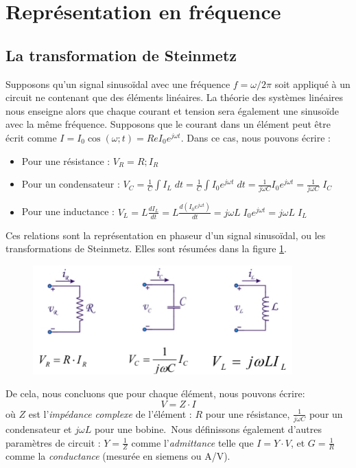 \section{Représentation en fréquence}
\subsection{La transformation de Steinmetz}
Supposons qu'un signal sinusoïdal avec une fréquence $f = \omega/2\pi$ soit appliqué à un circuit ne contenant que des éléments linéaires. La théorie des systèmes linéaires nous enseigne alors que chaque courant et tension sera également une sinusoïde avec la même fréquence. Supposons que le courant dans un élément peut être écrit comme $I = I_0 \cos(\omega ; t) = Re{I_0 e^{j\omega t}}$. Dans ce cas, nous pouvons écrire :
\begin{itemize}
	\item Pour une résistance : $V_R = R ; I_R$
	\item Pour un condensateur : $V_C = \frac{1}{C} \int I_L \; dt = \frac{1}{C} \int I_0 e^{j\omega t} \; dt = \frac{1}{j\omega C} I_0 e^{j\omega t} = \frac{1}{j\omega C} \; I_C$
	\item Pour une inductance : $V_L = L \frac{dI_L}{dt} = L \frac{d(I_0 e^{j\omega t})}{dt} = j \omega L \; I_0 e^{j\omega t} = j \omega L \; I_L$
\end{itemize}
Ces relations sont la représentation en phaseur d'un signal sinusoïdal, ou les transformations de Steinmetz. Elles sont résumées dans la figure \ref{fig:steinmetz}.

\begin{figure}[h!]
	\centering
	\includegraphics[width=10cm]{figures/ch00/steinmetz.jpg}
	\caption{}
	\label{fig:steinmetz}
\end{figure}

De cela, nous concluons que pour chaque élément, nous pouvons écrire:
$$
V = Z \cdot I
$$
où $Z$ est l'\emph{impédance complexe} de l'élément : $R$ pour une résistance, $\frac{1}{j\omega C}$ pour un condensateur et $j\omega L$ pour une bobine.\
Nous définissons également d'autres paramètres de circuit : $Y = \frac{1}{Z}$ comme l'\emph{admittance} telle que $I = Y \cdot V$, et $G = \frac{1}{R}$ comme la \emph{conductance} (mesurée en siemens ou A/V).

